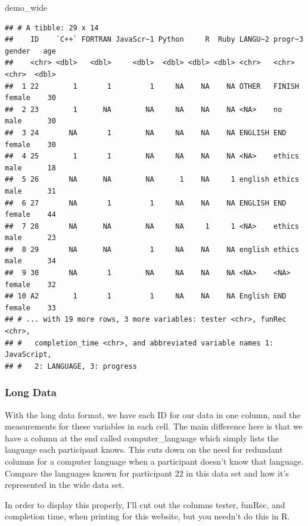 \documentclass[
]{book}
\newenvironment{Shaded}{\begin{snugshade}}{\end{snugshade}}
\newcommand{\NormalTok}[1]{#1}
\begin{document}
\begin{Shaded}
\begin{Highlighting}[]
\NormalTok{demo\_wide}
\end{Highlighting}
\end{Shaded}

\begin{verbatim}
## # A tibble: 29 x 14
##    ID    `C++` FORTRAN JavaScr~1 Python     R  Ruby LANGU~2 progr~3 gender   age
##    <chr> <dbl>   <dbl>     <dbl>  <dbl> <dbl> <dbl> <chr>   <chr>   <chr>  <dbl>
##  1 22        1       1         1     NA    NA    NA OTHER   FINISH  female    30
##  2 23        1      NA        NA     NA    NA    NA <NA>    no      male      30
##  3 24       NA       1        NA     NA    NA    NA ENGLISH END     female    30
##  4 25        1       1        NA     NA    NA    NA <NA>    ethics  male      18
##  5 26       NA      NA        NA      1    NA     1 english ethics  male      31
##  6 27       NA       1         1     NA    NA    NA ENGLISH END     female    44
##  7 28       NA      NA        NA     NA     1     1 <NA>    ethics  male      23
##  8 29       NA      NA         1     NA    NA    NA english ethics  male      34
##  9 30       NA       1        NA     NA    NA    NA <NA>    <NA>    female    32
## 10 A2        1       1         1     NA    NA    NA English END     female    33
## # ... with 19 more rows, 3 more variables: tester <chr>, funRec <chr>,
## #   completion_time <chr>, and abbreviated variable names 1: JavaScript,
## #   2: LANGUAGE, 3: progress
\end{verbatim}

\hypertarget{long-data}{%
\subsubsection{Long Data}\label{long-data}}

With the long data format, we have each ID for our data in one column, and the measurements for these variables in each cell. The main difference here is that we have a column at the end called computer\_language which simply lists the language each participant knows. This cuts down on the need for redundant columns for a computer language when a participant doesn't know that language. Compare the languages known for participant 22 in this data set and how it's represented in the wide data set.

In order to display this properly, I'll cut out the columns tester, funRec, and completion time, when printing for this website, but you needn't do this in R.
\end{document}
